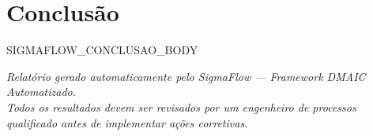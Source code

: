 
\section{Conclusão}

SIGMAFLOW_CONCLUSAO_BODY

\vspace{1cm}

\begin{center}
\small\textit{Relatório gerado automaticamente pelo SigmaFlow --- Framework DMAIC Automatizado.\\
Todos os resultados devem ser revisados por um engenheiro de processos qualificado antes de implementar ações corretivas.}
\end{center}
